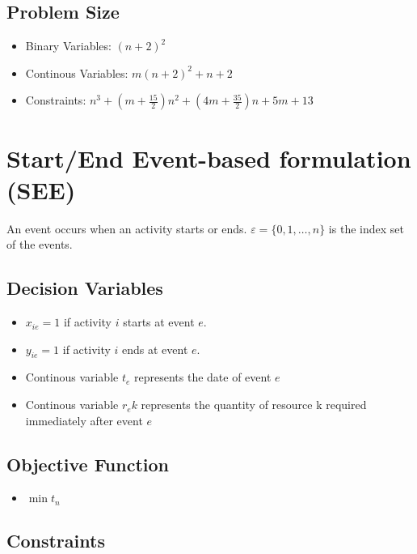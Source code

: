 \documentclass{paper}
\begin{document}
	\subsection{Problem Size}
	\begin{itemize}
		\item Binary Variables: $(n+2)^2$
		\item Continous Variables: $m(n+2)^2+n+2$ 
		\item Constraints: $n^3+(m+\frac{15}{2})n^2+(4m+\frac{35}{2})n+5m+13$ 
	  \end{itemize}
	\section{Start/End Event-based formulation (SEE)}
	An event occurs when an activity starts or ends.
	$\varepsilon = \{0,1,\dots,n\}$ is the index set of the events.

	\subsection{Decision Variables}
	\begin{itemize}
	\item $x_{ie} = 1$ if activity $i$ starts at event $e$.
	\item $y_{ie} = 1$ if activity $i$ ends at event $e$.
	\item Continous variable $t_e$ represents the date of event $e$
	\item Continous variable $r_ek$ represents the quantity of resource k required immediately after event $e$
	\end{itemize}

	\subsection{Objective Function}
	\begin{itemize}
	\item $\min t_n$	
	\end{itemize}
	
	\subsection{Constraints}
	
\end{document}
